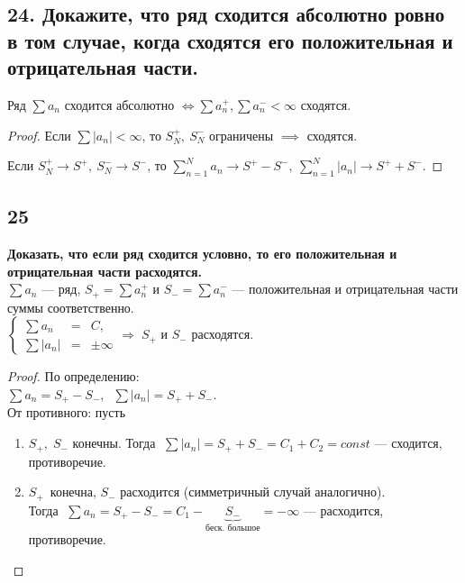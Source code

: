 \documentclass[a4paper, fleqn]{article}
\begin{document}
    \subsection*{24. Докажите, что ряд сходится абсолютно ровно в том случае, когда сходятся его положительная и отрицательная части.}
    \begin{proposition}
        Ряд $\sum a_n$ сходится абсолютно $\iff \sum a_n^+, \sum a_n^- < \infty$ сходятся. 
    \end{proposition}
    \begin{proof}
        Если $\sum \left|a_n\right| < \infty$, то $S_N^+,\ S_N^-$ ограничены $\implies$ сходятся.

        Если $S_N^+ \to S^+,\ S_N^- \to S^-$, то $\sum_{n=1}^N a_n \to S^+ - S^-,\ \sum_{n=1}^N \left|a_n\right| \to S^+ + S^-$.
    \end{proof}
        
    \subsection*{25}
        \textbf{ Доказать, что если ряд сходится условно, то его положительная и отрицательная части расходятся.} \\[5 pt]
	$\sum a_n$ --- ряд, $S_{+} = \sum a_n^{+}$ и $S_{-} = \sum a_n^{-}$
	 --- положительная и отрицательная части суммы соответственно. \\[3 pt]
	 $\left\{\begin{array}{lll} 
	 \sum a_n &=& C,\\[5 pt]
	 \sum |a_n| &=& \pm \infty
	 \end{array}\right. \Rightarrow \; S_{+}$ и $S_{-}$ расходятся.
	\begin{proof}
	По определению: \\[3 pt]
	$\sum a_n = S_{+} - S_{-}, \;\; \sum |a_n| = S_{+} + S_{-}$. \\[3 pt]
	От противного: пусть\\[-20 pt]
	\begin{enumerate}
	\item $S_{+}, \; S_{-}$ конечны. Тогда $\;\sum |a_n| = S_{+} + S_{-} = C_1 + C_2 = const$ --- сходится, противоречие.
	\item $S_{+} \, $ конечна, $S_{-}$ расходится (симметричный случай аналогично). \\[0 pt]
	Тогда $\; \sum a_n = S_{+} - S_{-} = C_1 - \underbrace{S_{-}}_{\text{беск. большое}} = -\infty$ --- расходится, противоречие.
	\end{enumerate}
	\end{proof}    
        
\end{document}
